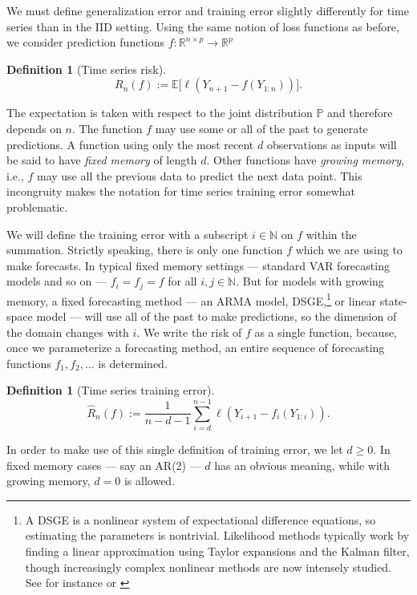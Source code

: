 \documentclass[12pt, oneside, a4paper]{article}
\theoremstyle{plain}
\newtheorem{definition}[theorem]{Definition}
\newcommand{\E}{\mathbb{E}}
\renewcommand{\P}{\mathbb{P}}
\newcommand{\R}{\mathbb{R}}
\renewcommand{\hat}[1]{\widehat{#1}}
\newcommand{\mnorm}[1]{\ell\left(#1\right)}
\newcommand{\Yij}[2]{Y_{#1:#2}}
\newcommand{\Yin}{\Yij{1}{n}}
\theoremstyle{definition}
\begin{document}
We must define generalization error and training error slightly differently for
time series than in the IID setting.  Using the same notion of loss functions
as before, we consider prediction functions $f : \R^{n\times p} \rightarrow
\R^p$
\begin{definition}
  [Time series risk]
  \begin{equation}
  R_n(f) := \E \Big[ \mnorm{ Y_{n+1} - f(\Yin)} \Big].
  \end{equation}
\end{definition}
The expectation is taken with respect to the joint distribution $\P$ and
therefore depends on $n$.  The function $f$ may use some or all of the past to
generate predictions.  A function using only the most recent $d$ observations
as inputs will be said to have \emph{fixed memory} of length $d$. Other
functions have \emph{growing memory}, i.e., $f$ may use all the previous data
to predict the next data point.  This incongruity makes the notation
for time series training error somewhat problematic.

We will define the
training error with a subscript $i\in\mathbb{N}$ on $f$ within the summation.
Strictly speaking, there is only one function $f$ which we are using
to make forecasts. In typical fixed memory settings --- standard VAR
forecasting models and so on --- $f_i=f_j=f$ for all $i,j \in \mathbb{N}$. But
for models with growing memory, a fixed forecasting method ---
an ARMA model, DSGE,\footnote{A DSGE is a nonlinear system of expectational
  difference equations, so estimating the parameters is nontrivial.  Likelihood
  methods typically work by finding a linear approximation using Taylor
  expansions and the Kalman filter, though increasingly complex nonlinear
  methods are now intensely studied.  See for instance
  \cite{DeJongDave2007} or
  \cite{DejongDharmarajan2009}} or linear state-space model --- will use all of
the past to make predictions, so the dimension of the domain changes
with $i$. We write the risk of $f$ as a single function, because, once
we parameterize a forecasting method, an entire sequence of
forecasting functions $f_1,f_2,\ldots$ is determined. 
\begin{definition}
  [Time series training error]
  \begin{equation}
  \hat{R}_n(f) := \frac{1}{n-d-1} \sum_{i=d}^{n-1} \mnorm{Y_{i+1} - f_i(\Yij{1}{i})}.
  \end{equation}
\end{definition}
In order to make
use of this single definition of training error, we let $d \geq 0$.
In fixed memory cases --- say an AR(2) --- $d$ has an obvious
meaning, while with growing memory, $d=0$ is allowed.
\end{document}
